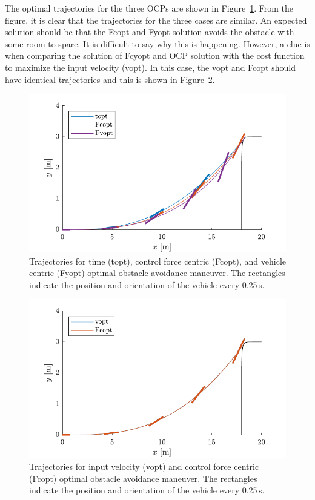 The optimal trajectories for the three OCPs are shown in Figure~\ref{fig:prob6_traj}. From the figure, it is clear that the trajectories for the three cases are similar. An expected solution should be that the Fcopt and Fyopt solution avoids the obstacle with some room to spare. It is difficult to say why this is happening. However, a clue is when comparing the solution of Fcyopt and OCP solution with the cost function to maximize the input velocity (vopt). In this case, the vopt and Fcopt should have identical trajectories and this is shown in Figure~\ref{fig:prob6_v2_traj}. 
\begin{figure}[h!]
    \centering
    \includegraphics{figures/prob6_traj.pdf}
    \caption{Trajectories for time (topt), control force centric (Fcopt), and vehicle centric (Fyopt) optimal obstacle avoidance maneuver. The rectangles indicate the position and orientation of the vehicle every 0.25\,s.}
    \label{fig:prob6_traj}
\end{figure}
\begin{figure}[t!]
    \centering
    \includegraphics{figures/prob6_v2_traj.pdf}
    \caption{Trajectories for input velocity (vopt) and control force centric (Fcopt) optimal obstacle avoidance maneuver. The rectangles indicate the position and orientation of the vehicle every 0.25\,s.}
    \label{fig:prob6_v2_traj}
\end{figure}
